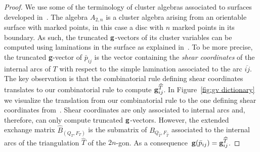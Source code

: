 \documentclass[pdftex]{sigma}%
\numberwithin{equation}{section}
\begin{document}
\begin{proof}
We use some of the terminology of cluster algebras associated to surfaces developed in~\cite{fomin2018cluster}.
The algebra $A_{2,n}$ is a cluster algebra arising from an orientable surface with marked points, in this case a disc with $n$ marked points in its boundary.
As such, the truncated ${\bf g}$-vectors of its cluster variables can be computed using laminations in the surface as explained in~\cite[Proposition 17.3]{fomin2018cluster}. To be more precise, the truncated {\bf g}-vector of $\bar p_{ij}$ is the vector containing the {\it shear coordinates} of the internal arcs of $T$ with respect to the simple lamination associated to the arc $\overline{ij} $.
The key observation is that the combinatorial rule defining shear coordinates translates to our combinatorial rule to compute ${\bf g}^{\widehat T}_{ij}$.
In Figure~\ref{fig:gv dictionary} we visualize the translation from our combinatorial rule to the one defining shear coordinates from~\cite[Definition~12.2, Figure~34]{fomin2018cluster}.
Shear coordinates are only associated to internal arcs and, therefore, can only compute truncated ${\bf g}$-vectors.
However, the extended exchange matrix $\widehat{B}_{(Q_T,F_T)}$ is the submatrix of $B_{Q_{\widehat T},F_{\widehat T}}$ associated to the internal arcs of the triangulation $\widehat T$ of the $2n$-gon.
As a conse\-qu\-ence~${\bf g}(\bar p_{ij})={\bf g}^{\widehat T}_{ij}$.
\end{proof}
\end{document}

